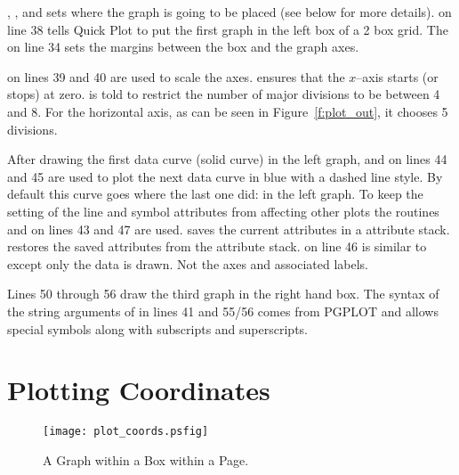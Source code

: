, , and  sets
where the graph is going to be placed (see below for more details).
 on line 38 tells Quick Plot to put the
first graph in the left box of a 2 box grid. The  on
line 34 sets the margins between the box and the graph axes.

 on lines 39 and 40 are used to scale the
axes.  ensures that the $x$--axis starts (or stops)
at zero.   is told to restrict the number of
major divisions to be between 4 and 8. For the horizontal axis, as can be
seen in Figure~\ref{f:plot_out}, it chooses 5 divisions.

After drawing the first data curve (solid curve) in the left graph,
 and  on lines 44 and
45 are used to plot the next data curve in blue with a dashed line
style. By default this curve goes where the last one did: in the left
graph. To keep the setting of the line and symbol attributes from
affecting other plots the routines  and
 on lines 43 and 47 are used. 
saves the current attributes in a attribute
stack.  restores the saved attributes from the
attribute stack.  on line 46 is similar to
 except only the data is drawn. Not the axes and
associated labels.

Lines 50 through 56 draw the third graph in the right hand box.  The
syntax of the string arguments of  in lines 41 and
55/56 comes from PGPLOT and allows special symbols along with subscripts
and superscripts.

\section{Plotting Coordinates}
\label{s:plot_coords}

\begin{figure}
  \centering
  \texttt{[image: plot\_coords.psfig]}
  \caption{A Graph within a Box within a Page.}
  \label{f:plot_coords}
\end{figure}

